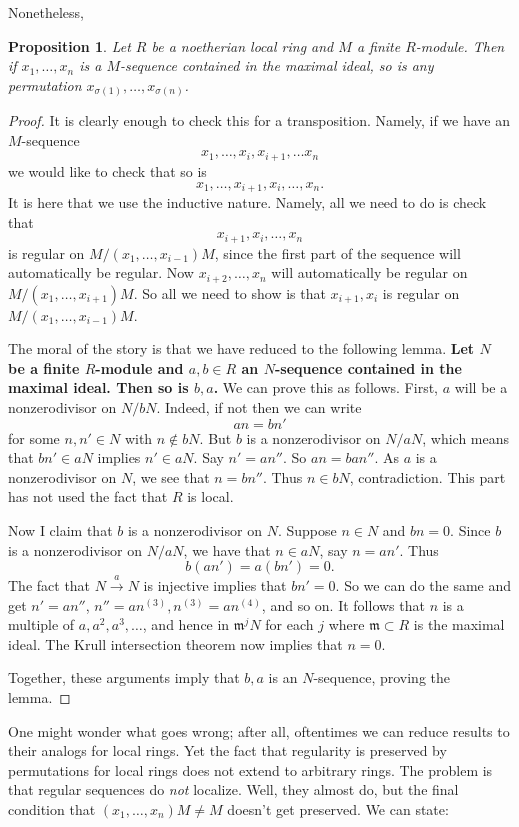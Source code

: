 \documentclass{article}
\newtheorem{proposition}{Proposition}
\begin{document}
Nonetheless, 
\begin{proposition} 
Let $R$ be a noetherian local ring and $M$ a finite $R$-module. Then if $x_1,
\dots, x_n$ is a $M$-sequence contained in the maximal ideal, so is any permutation $x_{\sigma(1)}, \dots,
x_{\sigma(n)}$.
\end{proposition} 
\begin{proof} 
It is clearly enough to check this for a transposition. Namely, if we have an
$M$-sequence
\[ x_1, \dots, x_i, x_{i+1}, \dots x_n  \]
we would like to check that so is
\[ x_1, \dots, x_{i+1}, x_i, \dots, x_n.  \]
It is here that we use the inductive nature. Namely, all we need to do is check
that
\[ x_{i+1}, x_i, \dots,x_n  \]
is regular on $M/(x_1, \dots,x_{i-1}) M$, since the first part of the sequence
will automatically be regular. Now $x_{i+2}, \dots, x_n$ will automatically be
regular on $M/(x_1, \dots, x_{i+1})M$. So all we need to show is that
$x_{i+1}, x_i$ is regular on $M/(x_1, \dots, x_{i-1})M$.

The moral of the story is that we have reduced to the following lemma.
\textbf{Let $N$
be a finite $R$-module and 
$a,b \in R$ an $N$-sequence contained in the maximal ideal. Then so is $b,a$.}
We can prove this as follows. First, $a$ will be a nonzerodivisor on $N/bN$.
Indeed, if not then we can write
\[ an = bn'  \]
for some $n,n' \in N$ with $n \notin bN$. But $b$ is a nonzerodivisor on
$N/aN$, which means that $bn' \in aN$ implies $n' \in aN$. Say $n' = an''$. So
$an = ba n''$. As $a$ is a nonzerodivisor on $N$, we see that $n = bn''$. Thus
$n \in bN$, contradiction.
This part has not used the fact that $R$ is local.

Now I claim that $b$ is a nonzerodivisor on $N$. Suppose $n \in N$ and $bn =
0$. Since $b$ is a nonzerodivisor on $N/aN$, we have that $n \in aN$, say $n =
an'$. Thus 
\[ b(an') = a(bn') = 0.  \]
The fact that $N \stackrel{a}{\to} N$ is injective implies that $bn' = 0$. So
we can do the same and get $n' = an''$, $n'' = a n^{(3)}, n^{(3)} =a n^{(4)}$, and
so on. It follows that $n$ is a multiple of $a, a^2,a^3, \dots$, and hence in
$\mathfrak{m}^j N$ for each $j$ where $\mathfrak{m} \subset R$ is the maximal
ideal. The Krull intersection theorem now implies that $n = 0$. 

Together, these arguments imply that $b,a$ is an $N$-sequence, proving the
lemma.
\end{proof} 


One might wonder what goes wrong; after all, oftentimes we can reduce results
to their analogs for local rings. Yet the fact that regularity is preserved by
permutations for local rings does not extend to arbitrary rings.
The problem is that regular sequences do \emph{not} localize. Well, they almost
do, but the final condition that $(x_1, \dots, x_n) M \neq M$ doesn't get
preserved.
We can state:
\end{document}
